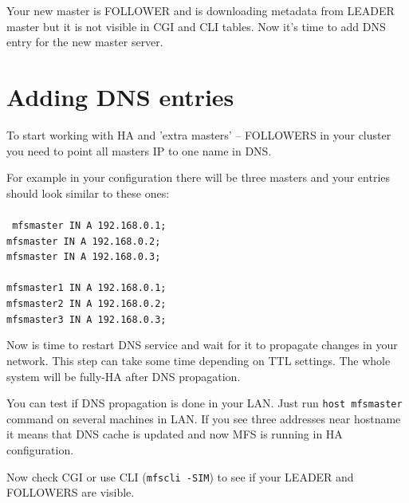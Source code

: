 \documentclass[a4paper,11pt,english]{report}
\def\code#1{\texttt{#1}}
\begin{document}
		Your new master is FOLLOWER and is downloading metadata from LEADER master but it is not visible in CGI and CLI tables. Now it's time to add DNS entry for the new master server.  

		\section{Adding DNS entries}
		To start working with HA and 'extra masters' -- FOLLOWERS in your cluster you need to point all masters IP to one name in DNS.
		
		For example in your configuration there will be three masters and your entries should look similar to these ones:\\\\
		\code{
		mfsmaster	IN	A	192.168.0.1;\\
		mfsmaster	IN	A	192.168.0.2;\\
		mfsmaster	IN	A	192.168.0.3;\\
		\\
		mfsmaster1	IN	A	192.168.0.1;\\
		mfsmaster2	IN	A	192.168.0.2;\\
		mfsmaster3	IN	A	192.168.0.3;\\				
		} 		

		Now is time to restart DNS service and wait for it to propagate changes in your network. This step can take some time depending on TTL settings. The whole system will be fully-HA after DNS propagation.
	
		You can test if DNS propagation is done in your LAN. Just run \code{host mfsmaster} command on several machines in LAN. If you see three addresses near hostname it means that DNS cache is updated and now MFS is running in HA configuration.
		
		Now check CGI or use CLI (\code{mfscli -SIM}) to see if your LEADER and FOLLOWERS are visible.
	
\end{document}
